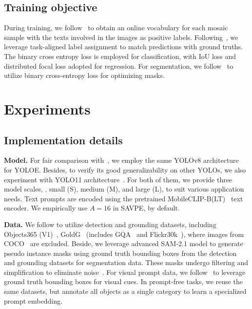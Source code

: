 \documentclass[10pt,twocolumn,letterpaper]{article}
\begin{document}
\subsection{Training objective}
During training, we follow~\cite{cheng2024yoloworld} to obtain an online vocabulary for each mosaic sample with the texts involved in the images as positive labels. Following~\cite{jocherultralytics}, we leverage task-aligned label assignment to match predictions with ground truths. The binary cross entropy loss is employed for classification, with IoU loss and distributed focal loss adopted for regression. For segmentation, we follow~\cite{bolya2019yolact} to utilize binary cross-entropy loss for optimizing masks.

\section{Experiments}
\subsection{Implementation details}
\textbf{Model.} For fair comparison with~\cite{cheng2024yoloworld}, we employ the same YOLOv8 architecture~\cite{jocherultralytics} for YOLOE. Besides, to verify its good generalizability on other YOLOs, we also experiment with YOLO11 architecture~\cite{jocherultralytics}. For both of them, we provide three model scales, \ie, small (S), medium (M), and large (L), to suit various application needs. Text prompts are encoded using the pretrained MobileCLIP-B(LT)~\cite{vasu2024mobileclip} text encoder. We empirically use $A=16$ in SAVPE, by default.

\textbf{Data.} We follow \cite{cheng2024yoloworld} to utilize detection and grounding datasets, including Objects365 (V1)~\cite{shao2019objects365}, GoldG~\cite{kamath2021mdetr} (includes GQA~\cite{hudson2019gqa} and Flickr30k~\cite{plummer2015flickr30k}), where images from COCO~\cite{lin2014mscoco} are excluded. Beside, we leverage advanced SAM-2.1 \cite{ravi2024sam2} model to generate pseudo instance masks using ground truth bounding boxes from the detection and grounding datasets for segmentation data. These masks undergo filtering and simplification to eliminate noise~\cite{douglas1973polydp}. For visual prompt data, we follow~\cite{jiang2024trex2} to leverage ground truth bounding boxes for visual cues. In prompt-free tasks, we reuse the same datasets, but annotate all objects as a single category to learn a specialized prompt embedding.
\end{document}
